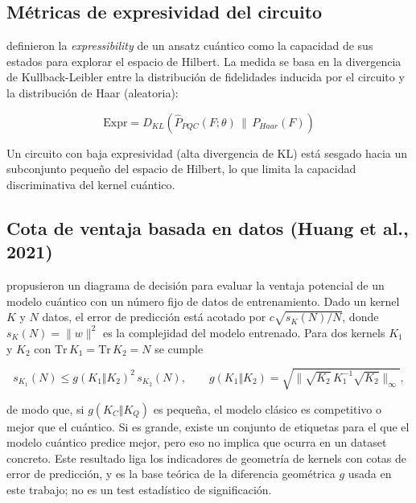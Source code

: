 \subsection{Métricas de expresividad del circuito}

\citet{sim2019} definieron la \textit{expressibility} de un ansatz cuántico como la capacidad de sus estados para explorar el espacio de Hilbert. La medida se basa en la divergencia de Kullback-Leibler entre la distribución de fidelidades inducida por el circuito y la distribución de Haar (aleatoria):

\begin{equation}
    \text{Expr} = D_{KL}(\hat{P}_{PQC}(F; \theta) \,\|\, P_{Haar}(F))
    \label{eq:expressibility}
\end{equation}

Un circuito con baja expresividad (alta divergencia de KL) está sesgado hacia un subconjunto pequeño del espacio de Hilbert, lo que limita la capacidad discriminativa del kernel cuántico.

\subsection{Cota de ventaja basada en datos (Huang et al., 2021)}

\citet{huang2021} propusieron un diagrama de decisión para evaluar la ventaja potencial de un modelo cuántico con un número fijo de datos de entrenamiento. Dado un kernel $K$ y $N$ datos, el error de predicción está acotado por $c\sqrt{s_K(N)/N}$, donde $s_K(N)=\lVert w\rVert^2$ es la complejidad del modelo entrenado. Para dos kernels $K_1$ y $K_2$ con $\mathrm{Tr}\,K_1=\mathrm{Tr}\,K_2=N$ se cumple

\begin{equation}
    s_{K_1}(N) \leq g(K_1\Vert K_2)^2\, s_{K_2}(N),
    \qquad
    g(K_1\Vert K_2)=\sqrt{\bigl\lVert \sqrt{K_2}\,K_1^{-1}\sqrt{K_2}\bigr\rVert_\infty},
    \label{eq:huang_bound}
\end{equation}

de modo que, si $g(K_C\Vert K_Q)$ es pequeña, el modelo clásico es competitivo o mejor que el cuántico. Si es grande, existe un conjunto de etiquetas para el que el modelo cuántico predice mejor, pero eso no implica que ocurra en un dataset concreto. Este resultado liga los indicadores de geometría de kernels con cotas de error de predicción, y es la base teórica de la diferencia geométrica $g$ usada en este trabajo; no es un test estadístico de significación.

